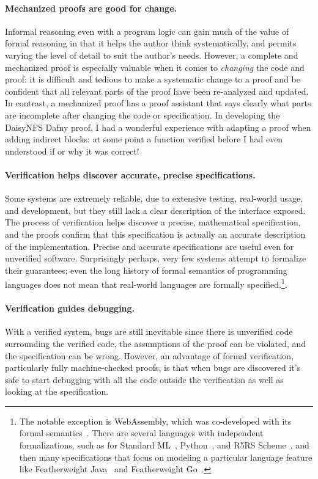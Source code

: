 \paragraph{Mechanized proofs are good for change.} Informal
reasoning even with a program logic can gain much of the value of formal
reasoning in that it helps the author think systematically, and permits varying
the level of detail to suit the author's needs. However, a complete and
mechanized proof is especially valuable when it comes to \emph{changing} the
code and proof: it is difficult and tedious to make a systematic change to a
proof and be confident that all relevant parts of the proof have been
re-analyzed and updated. In contrast, a mechanized proof has a proof assistant
that says clearly what parts are incomplete after changing the code or
specification. In developing the DaisyNFS Dafny proof, I had a wonderful
experience with adapting a proof when adding indirect blocks: at some point a
function verified before I had even understood if or why it was correct!

\paragraph{Verification helps discover accurate, precise specifications.} Some
systems are extremely reliable, due to extensive testing, real-world usage, and
development, but they still lack a clear description of the interface exposed.
The process of verification helps discover a precise, mathematical
specification, and the proofs confirm that this specification is actually an
accurate description of the implementation. Precise and accurate specifications
are useful even for unverified software. Surprisingly perhaps, very few systems
attempt to formalize their guarantees; even the long history of formal semantics
of programming languages does not mean that real-world languages are formally
specified.\footnote{The notable exception is WebAssembly, which was co-developed
with its formal semantics~\cite{haas:wasm}. There are several languages with
independent formalizations, such as for Standard ML~\cite{harper:standard-ml}, Python~\cite{politz:python-semantics}, and R5RS Scheme~\cite{matthews:r5rs-semantics},
and then many specifications that focus on modeling a particular language
feature like Featherweight Java~\cite{igarashi:featherweight-java} and
Featherweight Go~\cite{griesemer:featherweight-go}.}.

\paragraph{Verification guides debugging.} With a verified system, bugs are
still inevitable since there is unverified code surrounding the verified code,
the assumptions of the proof can be violated, and the specification can be
wrong. However, an advantage of formal verification, particularly fully
machine-checked proofs, is that when bugs are discovered it's safe to start
debugging with all the code outside the verification as well as looking at the
specification.

